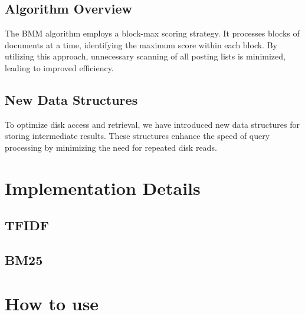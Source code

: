 \subsection{Algorithm Overview}

The BMM algorithm employs a block-max scoring strategy. It processes blocks of documents at a time, identifying the maximum 
score within each block. By utilizing this approach, unnecessary scanning of all posting lists is minimized, leading to 
improved efficiency.

\subsection{New Data Structures}

To optimize disk access and retrieval, we have introduced new data structures for storing intermediate results. These 
structures enhance the speed of query processing by minimizing the need for repeated disk reads.

\section{Implementation Details}


\subsection{TFIDF}


\subsection{BM25}

\section{How to use}

